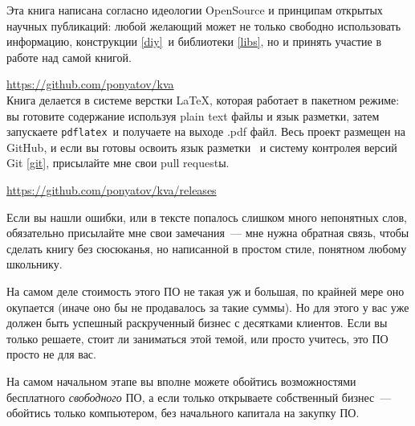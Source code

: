 

\bigskip

\noindent
Эта книга написана согласно идеологии OpenSource и принципам открытых научных
публикаций: любой желающий может не только свободно использовать информацию,
конструкции \ref{diy}\ и библиотеки \ref{libs}, но и принять участие в работе
над самой книгой. \licence


\bigskip
\url{https://github.com/ponyatov/kva}\\

\clearpage 
Книга делается в системе верстки \LaTeX{}, которая работает в пакетном
режиме:
вы готовите содержание используя plain text файлы и язык разметки, затем
запускаете \verb|pdflatex|\ и получаете на выходе .pdf файл. Весь проект
размещен на GitHub, и если вы готовы освоить язык разметки \cite{lvovsky}\ и
систему контролея версий Git \ref{git}, присылайте мне свои pull requestы.

\medskip 
\url{https://github.com/ponyatov/kva/releases}

\bigskip
Если вы нашли ошибки, или в тексте попалось слишком много непонятных слов,
обязательно присылайте мне свои замечания\ --- мне нужна обратная связь, чтобы
сделать книгу без сюсюканья, но написанной в простом стиле, понятном
любому школьнику.

\clearpage

На самом деле стоимость этого ПО не такая уж и большая, по крайней мере оно
окупается (иначе оно бы не продавалось за такие суммы). Но для этого у вас уже
должен быть успешный раскрученный бизнес с десятками клиентов. Если вы только
решаете, стоит ли заниматься этой темой, или просто учитесь, это ПО просто не
для вас.

На самом начальном этапе вы вполне можете обойтись возможностями
бесплатного \textit{свободного} ПО, а если только открываете собственный бизнес\
--- обойтись только компьютером, без начального капитала на закупку ПО.

\clearpage
{}

